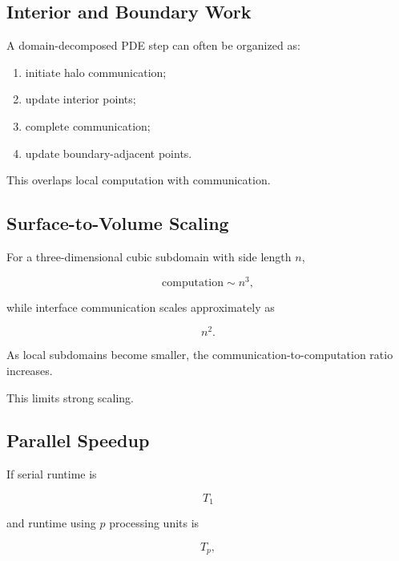 \subsection{Interior and Boundary Work}
\label{subsec:interior-boundary-work}

A domain-decomposed PDE step can often be organized as:

\begin{enumerate}
    \item initiate halo communication;
    \item update interior points;
    \item complete communication;
    \item update boundary-adjacent points.
\end{enumerate}

This overlaps local computation with communication.

\subsection{Surface-to-Volume Scaling}
\label{subsec:hpmc-surface-volume-scaling}

For a three-dimensional cubic subdomain with side length \(n\),

\[
\boxed{
\text{computation}
\sim
n^3,
}
\]

while interface communication scales approximately as

\[
\boxed{
n^2.
}
\]

As local subdomains become smaller, the communication-to-computation ratio
increases.

This limits strong scaling.

\subsection{Parallel Speedup}
\label{subsec:hpmc-speedup}

If serial runtime is

\[
T_1
\]

and runtime using \(p\) processing units is

\[
T_p,
\]

